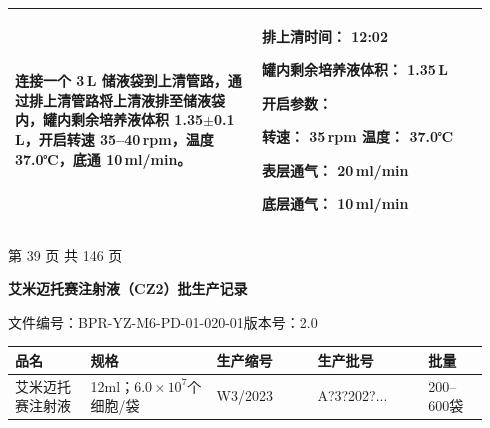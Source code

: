 \documentclass[UTF8,10pt,a4paper,fontset=fandol]{ctexart}
\newcommand{\fieldvalue}[1]{#1}
\newcommand{\handwritten}[1]{#1}
\begin{document}
\begin{tabular}{|p{0.49\linewidth}|p{0.45\linewidth}|}
\begin{minipage}[t]{0.47\linewidth}
连接一个 3\,L 储液袋到上清管路，通过排上清管路将上清液排至储液袋内，罐内剩余培养液体积 1.35$\pm$0.1\,L，开启转速 35--40\,rpm，温度 37.0℃，底通 10\,ml/min。
\end{minipage}
&
\begin{minipage}[t]{0.43\linewidth}
排上清时间：
\fieldvalue{\handwritten{12:02}}

罐内剩余培养液体积：
\fieldvalue{\handwritten{1.35}}\,L

开启参数：

转速：
\fieldvalue{\handwritten{35}}\,rpm
\quad
温度：
\fieldvalue{\handwritten{37.0}}℃

表层通气：
\fieldvalue{\handwritten{20}}\,ml/min

底层通气：
\fieldvalue{\handwritten{10}}\,ml/min
\end{minipage}
\\
\hline
\end{tabular}

\begin{center}
第 39 页 共 146 页
\end{center}

\newpage

\begin{center}
\textbf{艾米迈托赛注射液（CZ2）批生产记录}
\end{center}

文件编号：BPR-YZ-M6-PD-01-020-01\hspace{1em}版本号：2.0

\begin{tabular}{|p{0.15\linewidth}|p{0.25\linewidth}|p{0.20\linewidth}|p{0.22\linewidth}|p{0.12\linewidth}|}
\hline
品名 & 规格 & 生产缩号 & 生产批号 & 批量 \\
\hline
艾米迈托赛注射液 &
12ml；$6.0\times10^{7}$个细胞/袋 &
\fieldvalue{\handwritten{W3/2023}} &
\fieldvalue{\handwritten{A?3?202?...}} &
200--600袋 \\
\hline
\end{tabular}
\end{document}
